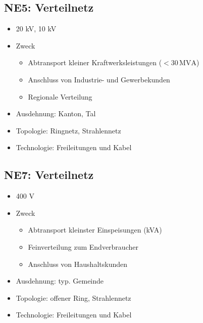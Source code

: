 \subsection{NE5: Verteilnetz}


\begin{itemize}
    \item 20 kV, 10 kV
    \item Zweck
    \begin{itemize}
        \item Abtransport kleiner Kraftwerksleistungen (\(< 30\,\text{MVA}\))
        \item Anschluss von Industrie- und Gewerbekunden
        \item Regionale Verteilung
    \end{itemize}
    \item Ausdehnung: Kanton, Tal
    \item Topologie: Ringnetz, Strahlennetz
    \item Technologie: Freileitungen und Kabel
\end{itemize}

\subsection{NE7: Verteilnetz}

\begin{itemize}
    \item 400 V
    \item Zweck
    \begin{itemize}
        \item Abtransport kleinster Einspeisungen (kVA)
        \item Feinverteilung zum Endverbraucher
        \item Anschluss von Haushaltskunden
    \end{itemize}
    \item Ausdehnung: typ. Gemeinde
    \item Topologie: offener Ring, Strahlennetz
    \item Technologie: Freileitungen und Kabel
\end{itemize}





















